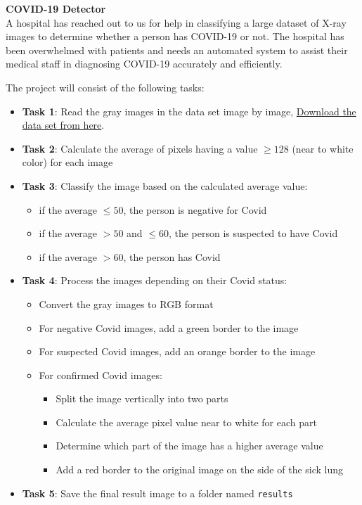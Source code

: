 \question
{\center \bf COVID-19 Detector\\}
A hospital has reached out to us for help in classifying a large dataset of X-ray images to determine whether a person has COVID-19 or not. The hospital has been overwhelmed with patients and needs an automated system to assist their medical staff in diagnosing COVID-19 accurately and efficiently.


The project will consist of the following tasks:


\begin{itemize}
    \item
      \textbf{Task 1}: Read the gray images in the data set image by image, \href{https://ydjemmada.github.io/projects/xrays.zip}{Download the data set from here}.
    \item
      \textbf{Task 2}: Calculate the average of pixels having a value $\geq 128$ (near to white color) for each image
    \item
      \textbf{Task 3}: Classify the image based on the calculated average
      value:
    
      \begin{itemize}

      \item
        if the average $\leq 50$, the person is negative for Covid
      \item
        if the average $>50$ and $\leq 60$, the person is
        suspected to have Covid
      \item
        if the average $>60$, the person has Covid
      \end{itemize}
    \item
      \textbf{Task 4}: Process the images depending on their Covid status:
    
      \begin{itemize}

      \item
        Convert the gray images to RGB format
      \item
        For negative Covid images, add a green border to the image
      \item
        For suspected Covid images, add an orange border to the image
      \item
        For confirmed Covid images:
    
        \begin{itemize}

        \item
          Split the image vertically into two parts
        \item
          Calculate the average pixel value near to white for each part
        \item
          Determine which part of the image has a higher average value
        \item
          Add a red border to the original image on the side of the sick
          lung
        \end{itemize}
      \end{itemize}
    \item
      \textbf{Task 5}: Save the final result image to a folder named \verb|results|
    \end{itemize}
